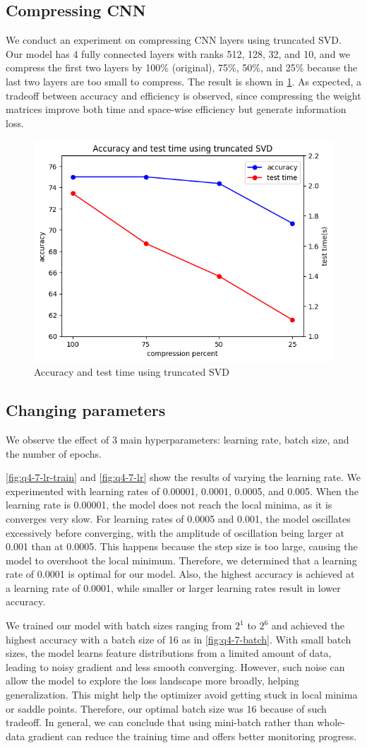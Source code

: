 \subsection{Compressing CNN}
We conduct an experiment on compressing CNN layers using truncated SVD. Our model has 4 fully connected layers with ranks 512, 128, 32, and 10, and we compress the first two layers by 100\% (original), 75\%, 50\%, and 25\% because the last two layers are too small to compress. The result is shown in \cref{fig:cnn_svd}. As expected, a tradeoff between accuracy and efficiency is observed, since compressing the weight matrices improve both time and space-wise efficiency but generate information loss.

\begin{figure}
	\centering
	\includegraphics[width=0.4\linewidth]{image/q4-6-svd.png}
	\caption{Accuracy and test time using truncated SVD}
	\label{fig:cnn_svd}
\end{figure}

\subsection{Changing parameters}
We observe the effect of 3 main hyperparameters: learning rate, batch size, and the number of epochs.

\cref{fig:q4-7-lr-train} and \cref{fig:q4-7-lr} show the results of varying the learning rate. We experimented with learning rates of 0.00001, 0.0001, 0.0005, and 0.005. When the learning rate is 0.00001, the model does not reach the local minima, as it is converges very slow. For learning rates of 0.0005 and 0.001, the model oscillates excessively before converging, with the amplitude of oscillation being larger at 0.001 than at 0.0005. This happens because the step size is too large, causing the model to overshoot the local minimum. Therefore, we determined that a learning rate of 0.0001 is optimal for our model. Also, the highest accuracy is achieved at a learning rate of 0.0001, while smaller or larger learning rates result in lower accuracy. 

We trained our model with batch sizes ranging from $2^1$ to $2^6$ and achieved the highest accuracy with a batch size of 16 as in \cref{fig:q4-7-batch}. With small batch sizes, the model learns feature distributions from a limited amount of data, leading to noisy gradient and less smooth converging. However, such noise can allow the model to explore the loss landscape more broadly, helping generalization. This might help the optimizer avoid getting stuck in local minima or saddle points. Therefore, our optimal batch size was 16 because of such tradeoff. In general, we can conclude that using mini-batch rather than whole-data gradient can reduce the training time and offers better monitoring progress.

